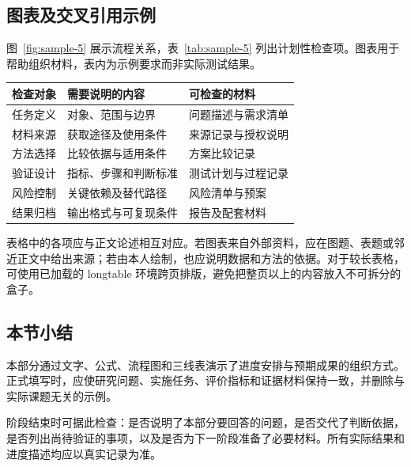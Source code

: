 \subsection{图表及交叉引用示例}
图~\ref{fig:sample-5} 展示流程关系，表~\ref{tab:sample-5} 列出计划性检查项。图表用于帮助组织材料，表内为示例要求而非实际测试结果。
\begin{center}
\begin{minipage}{\linewidth}\centering
{}
\label{fig:sample-5}
\end{minipage}\end{center}
\begin{center}\begin{minipage}{\linewidth}\centering
{}\label{tab:sample-5}
\begin{tabularx}{\linewidth}{p{23mm}XX}
\toprule
检查对象 & 需要说明的内容 & 可检查的材料\\
\midrule
任务定义 & 对象、范围与边界 & 问题描述与需求清单\\
材料来源 & 获取途径及使用条件 & 来源记录与授权说明\\
方法选择 & 比较依据与适用条件 & 方案比较记录\\
验证设计 & 指标、步骤和判断标准 & 测试计划与过程记录\\
风险控制 & 关键依赖及替代路径 & 风险清单与预案\\
结果归档 & 输出格式与可复现条件 & 报告及配套材料\\
\bottomrule
\end{tabularx}
\end{minipage}\end{center}
表格中的各项应与正文论述相互对应。若图表来自外部资料，应在图题、表题或邻近正文中给出来源；若由本人绘制，也应说明数据和方法的依据。对于较长表格，可使用已加载的 longtable 环境跨页排版，避免把整页以上的内容放入不可拆分的盒子。

\subsection{本节小结}
本部分通过文字、公式、流程图和三线表演示了进度安排与预期成果的组织方式。正式填写时，应使研究问题、实施任务、评价指标和证据材料保持一致，并删除与实际课题无关的示例。

阶段结束时可据此检查：是否说明了本部分要回答的问题，是否交代了判断依据，是否列出尚待验证的事项，以及是否为下一阶段准备了必要材料。所有实际结果和进度描述均应以真实记录为准。

